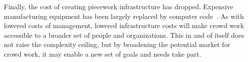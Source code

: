 \documentclass[trackingWork]{subfiles}
\begin{document}
Finally, the cost of creating piecework infrastructure has dropped. 
Expensive manufacturing equipment has been largely replaced by computer code~\cite{lessig2006code}.
As with lowered costs of management, lowered infrastructure costs will make crowd work accessible to a broader set of people and organizations.
This in and of itself does not raise the complexity ceiling, but by broadening the potential market for crowd work, it may enable a new set of goals and needs take part.

\end{document}
